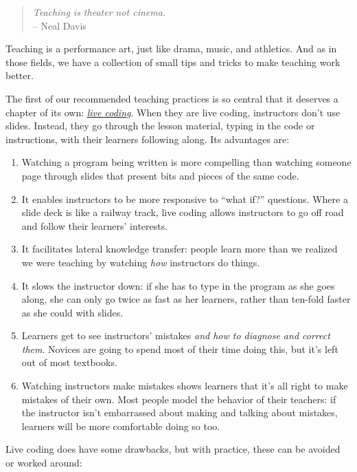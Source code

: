 \documentclass[10pt,statementpaper]{memoir}
\begin{document}
\begin{quote}
\emph{Teaching is theater not cinema.}\\
-- Neal Davis
\end{quote}

Teaching is a performance art, just like drama, music, and athletics.
And as in those fields, we have a collection of small tips and tricks to
make teaching work better.

The first of our recommended teaching practices is so central that it
deserves a chapter of its own: \emph{\href{gloss.html\#live-coding}{live
coding}}. When they are live coding, instructors don't use slides.
Instead, they go through the lesson material, typing in the code or
instructions, with their learners following along. Its advantages are:

\begin{enumerate}
\def\labelenumi{\arabic{enumi}.}
\item
  Watching a program being written is more compelling than watching
  someone page through slides that present bits and pieces of the same
  code.
\item
  It enables instructors to be more responsive to ``what if?''
  questions. Where a slide deck is like a railway track, live coding
  allows instructors to go off road and follow their learners'
  interests.
\item
  It facilitates lateral knowledge transfer: people learn more than we
  realized we were teaching by watching \emph{how} instructors do
  things.
\item
  It slows the instructor down: if she has to type in the program as she
  goes along, she can only go twice as fast as her learners, rather than
  ten-fold faster as she could with slides.
\item
  Learners get to see instructors' mistakes \emph{and how to diagnose
  and correct them}. Novices are going to spend most of their time doing
  this, but it's left out of most textbooks.
\item
  Watching instructors make mistakes shows learners that it's all right
  to make mistakes of their own. Most people model the behavior of their
  teachers: if the instructor isn't embarrassed about making and talking
  about mistakes, learners will be more comfortable doing so too.
\end{enumerate}

Live coding does have some drawbacks, but with practice, these can be
avoided or worked around:
\end{document}

